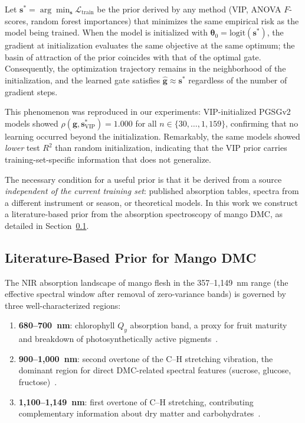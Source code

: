 \documentclass[preprint,12pt,hidelinks]{elsarticle}
\begin{document}
Let $\mathbf{s}^* = \arg\min_{\mathbf{s}} \mathcal{L}_{\mathrm{train}}$
be the prior derived by any method (VIP, ANOVA $F$-scores, random forest
importances) that minimizes the same empirical risk as the model being
trained. When the model is initialized with $\boldsymbol{\theta}_0 =
\mathrm{logit}(\mathbf{s}^*)$, the gradient at initialization evaluates
the same objective at the same optimum; the basin of attraction of the
prior coincides with that of the optimal gate. Consequently, the
optimization trajectory remains in the neighborhood of the initialization,
and the learned gate satisfies $\hat{\mathbf{g}} \approx \mathbf{s}^*$
regardless of the number of gradient steps.

This phenomenon was reproduced in our experiments: VIP-initialized
PGSGv2 models showed $\rho(\mathbf{g}, \mathbf{s}^*_\mathrm{VIP}) = 1.000$
for all $n \in \{30, \ldots, 1{,}159\}$, confirming that no learning
occurred beyond the initialization. Remarkably, the same models showed
\emph{lower} test $R^2$ than random initialization, indicating that the
VIP prior carries training-set-specific information that does not generalize.

The necessary condition for a useful prior is that it be derived from
a source \emph{independent of the current training set}: published
absorption tables, spectra from a different instrument or season, or
theoretical models. In this work we construct a literature-based prior from
the absorption spectroscopy of mango DMC, as detailed in
Section~\ref{sec:prior}.

\subsection{Literature-Based Prior for Mango DMC}
\label{sec:prior}

The NIR absorption landscape of mango flesh in the 357--1{,}149~nm range
(the effective spectral window after removal of zero-variance bands) is
governed by three well-characterized regions:

\begin{enumerate}
  \item \textbf{680--700~nm}: chlorophyll $Q_y$ absorption band, a proxy
        for fruit maturity and breakdown of photosynthetically active
        pigments~\cite{saranwong2004}.
  \item \textbf{900--1{,}000~nm}: second overtone of the C--H stretching
        vibration, the dominant region for direct DMC-related spectral
        features (sucrose, glucose, fructose)~\cite{guthrie2005,saranwong2004}.
  \item \textbf{1{,}100--1{,}149~nm}: first overtone of C--H stretching,
        contributing complementary information about dry matter and carbohydrates~\cite{guthrie1998,guthrie2005}.
    
\end{enumerate}
\end{document}
